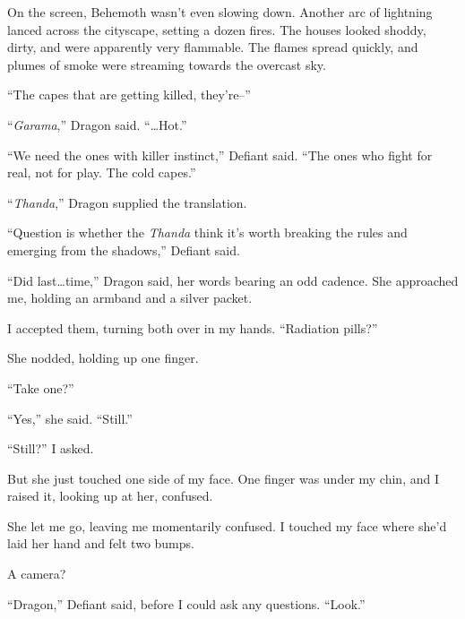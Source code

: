 On the screen, Behemoth wasn't even slowing down.  Another arc of lightning lanced across the cityscape, setting a dozen fires.  The houses looked shoddy, dirty, and were apparently very flammable.  The flames spread quickly, and plumes of smoke were streaming towards the overcast sky.



``The capes that are getting killed, they're--''



``\emph{Garama},'' Dragon said.  ``\ldots{}Hot.''



``We need the ones with killer instinct,'' Defiant said.  ``The ones who fight for real, not for play.  The cold capes.''



``\emph{Thanda},'' Dragon supplied the translation.



``Question is whether the \emph{Thanda} think it's worth breaking the rules and emerging from the shadows,'' Defiant said.



``Did last\ldots  time,'' Dragon said, her words bearing an odd cadence.  She approached me, holding an armband and a silver packet.



I accepted them, turning both over in my hands.  ``Radiation pills?''



She nodded, holding up one finger.



``Take one?''



``Yes,'' she said.  ``Still.''



``Still?''  I asked.



But she just touched one side of my face.  One finger was under my chin, and I raised it, looking up at her, confused.



She let me go, leaving me momentarily confused.  I touched my face where she'd laid her hand and felt two bumps.



A camera?



``Dragon,'' Defiant said, before I could ask any questions.  ``Look.''



